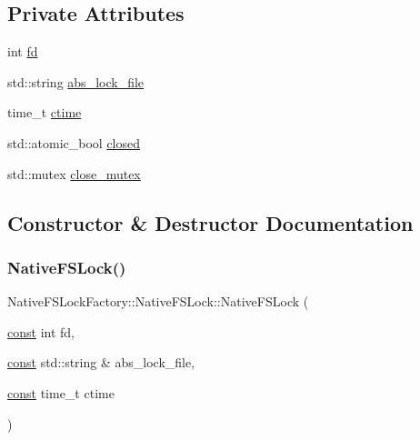 \subsection*{Private Attributes}
\begin{DoxyCompactItemize}
\item 
int \mbox{\hyperlink{classlucene_1_1core_1_1store_1_1NativeFSLockFactory_1_1NativeFSLock_aecbf3afe520573e5991bc7e08fed3c37}{fd}}
\item 
std\+::string \mbox{\hyperlink{classlucene_1_1core_1_1store_1_1NativeFSLockFactory_1_1NativeFSLock_acd2428c75098a1be466dfd9bec72ccf6}{abs\+\_\+lock\+\_\+file}}
\item 
time\+\_\+t \mbox{\hyperlink{classlucene_1_1core_1_1store_1_1NativeFSLockFactory_1_1NativeFSLock_abfb301b0a7e90b605382021622251b40}{ctime}}
\item 
std\+::atomic\+\_\+bool \mbox{\hyperlink{classlucene_1_1core_1_1store_1_1NativeFSLockFactory_1_1NativeFSLock_a659f8c7979adf9bae904b621fb257966}{closed}}
\item 
std\+::mutex \mbox{\hyperlink{classlucene_1_1core_1_1store_1_1NativeFSLockFactory_1_1NativeFSLock_a6cf23342228923a9bd929b220f6a2635}{close\+\_\+mutex}}
\end{DoxyCompactItemize}


\subsection{Constructor \& Destructor Documentation}
\mbox{\label{classlucene_1_1core_1_1store_1_1NativeFSLockFactory_1_1NativeFSLock_ab646618f49fd04dd5404a74bdaefd3c4}} 
\subsubsection{\texorpdfstring{Native\+F\+S\+Lock()}{NativeFSLock()}\hspace{0.1cm}{\footnotesize\ttfamily [1/3]}}
{\footnotesize\ttfamily Native\+F\+S\+Lock\+Factory\+::\+Native\+F\+S\+Lock\+::\+Native\+F\+S\+Lock (\begin{DoxyParamCaption}\item[{\mbox{\hyperlink{ZlibCrc32_8h_a2c212835823e3c54a8ab6d95c652660e}{const}} int}]{fd,  }\item[{\mbox{\hyperlink{ZlibCrc32_8h_a2c212835823e3c54a8ab6d95c652660e}{const}} std\+::string \&}]{abs\+\_\+lock\+\_\+file,  }\item[{\mbox{\hyperlink{ZlibCrc32_8h_a2c212835823e3c54a8ab6d95c652660e}{const}} time\+\_\+t}]{ctime }\end{DoxyParamCaption})}

